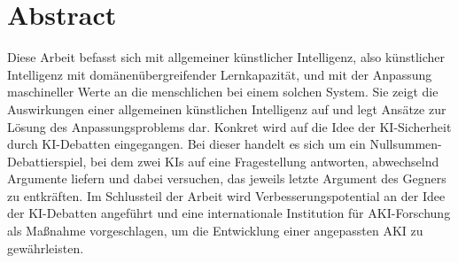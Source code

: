\chapter*{Abstract}
Diese Arbeit befasst sich mit allgemeiner künstlicher Intelligenz, also künstlicher Intelligenz mit domänenübergreifender Lernkapazität, und mit der Anpassung maschineller Werte an die menschlichen bei einem solchen System. Sie zeigt die Auswirkungen einer allgemeinen künstlichen Intelligenz auf und legt Ansätze zur Lösung des Anpassungsproblems dar. Konkret wird auf die Idee der KI-Sicherheit durch KI-Debatten eingegangen. Bei dieser handelt es sich um ein Nullsummen-Debattierspiel, bei dem zwei KIs auf eine Fragestellung antworten, abwechselnd Argumente liefern und dabei versuchen, das jeweils letzte Argument des Gegners zu entkräften. Im Schlussteil der Arbeit wird Verbesserungspotential an der Idee der KI-Debatten angeführt und eine internationale Institution für AKI-Forschung als Maßnahme vorgeschlagen, um die Entwicklung einer angepassten AKI zu gewährleisten.




